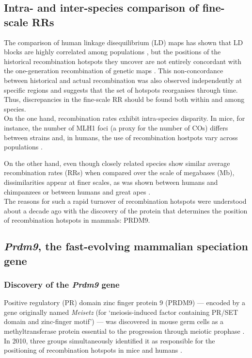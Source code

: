 \subsection{Intra- and inter-species comparison of fine-scale RRs}

The comparison of human linkage disequilibrium (LD) maps has shown that LD blocks are highly correlated among populations \citep{gabriel2002structure}, but the positions of the historical recombination hotspots they uncover are not entirely concordant with the one-generation recombination of genetic maps \citep{tapper2005map}. 
This non-concordance between historical and actual recombination was also observed independently at specific regions \citep{jeffreys2005human,kauppi2005localized} and suggests that the set of hotspots reorganises through time.
Thus, discrepancies in the fine-scale RR should be found both within and among species.\\

On the one hand, recombination rates exhibit intra-species disparity.
In mice, for instance, the number of MLH1 foci (a proxy for the number of COs) differs between strains \citep{koehler2002genetic,paigen2008recombinational,baier2014variation} and, in humans, the use of recombination hostpots vary across populations \citep{berg2011variants,hinch2011landscape}.

On the other hand, even though closely related species show similar average recombination rates (RRs) \citep{dumont2008evolution,hassold2009cytological,garcia-cruz2011comparative,auton2012finescale} when compared over the scale of megabases (Mb), dissimilarities appear at finer scales, as was shown between humans and chimpanzees \citep{ptak2005finescale,winckler2005comparison} or between humans and great apes \citep{stevison2016time}.\\

The reasons for such a rapid turnover of recombination hotspots were understood about a decade ago with the discovery of the protein that determines the position of recombination hotspots in mammals: PRDM9.


\subsection{\textit{Prdm9}, the fast-evolving mammalian speciation gene}

\subsubsection{Discovery of the \textit{Prdm9} gene}
Positive regulatory (PR) domain zinc finger protein 9 (PRDM9) — encoded by a gene originally named \textit{Meisetz} (for ‘meiosis-induced factor containing PR/SET domain and zinc-finger motif’) — was discovered in mouse germ cells as a methyltransferase protein essential to the progression through meiotic prophase \citep{hayashi2005histone,hayashi2006meisetz}.
In 2010, three groups simultaneously identified it as responsible for the positioning of recombination hotspots in mice and humans \citep[reviewed in \citealp{cheung2010genetic} and \citealp{hochwagen2010meiosis}]{baudat2010prdm9,myers2010drive,parvanov2010prdm9}.

